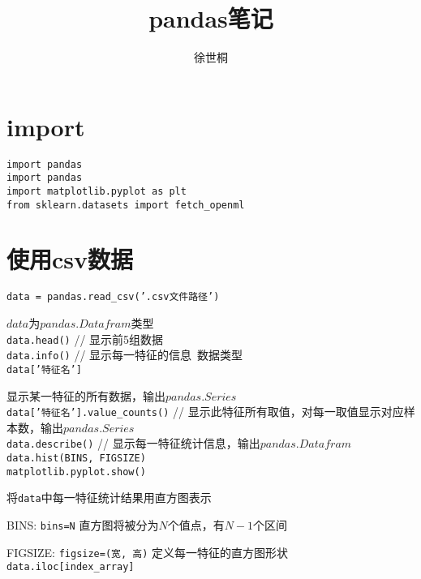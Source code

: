 \documentclass[UTF8]{ctexart}
\title{pandas笔记}
\author{徐世桐}
\date{}
\begin{document}
\maketitle

\section{import}
\noindent \texttt{import pandas}\\
\texttt{import pandas}\\
\texttt{import matplotlib.pyplot as plt}\\
\texttt{from sklearn.datasets import fetch\_openml}

\section{使用csv数据}
\noindent \texttt{data = pandas.read\_csv('.csv文件路径')}

  $data$为$pandas.Datafram$类型\\
\texttt{data.head()} // 显示前5组数据\\
\texttt{data.info()} // 显示每一特征的信息\ 数据类型\\
\texttt{data['特征名']} 
  
  显示某一特征的所有数据，输出$pandas.Series$\\
\texttt{data['特征名'].value\_counts()} // 显示此特征所有取值，对每一取值显示对应样本数，输出$pandas.Series$\\
\texttt{data.describe()} // 显示每一特征统计信息，输出$pandas.Datafram$\\
\texttt{data.hist(BINS, FIGSIZE)}\\
\texttt{matplotlib.pyplot.show()}

  将\texttt{data}中每一特征统计结果用直方图表示

  BINS: \texttt{bins=N} 直方图将被分为$N$个值点，有$N-1$个区间

  FIGSIZE: \texttt{figsize=(宽, 高)} 定义每一特征的直方图形状\\
\texttt{data.iloc[index\_array]}
\end{document}
